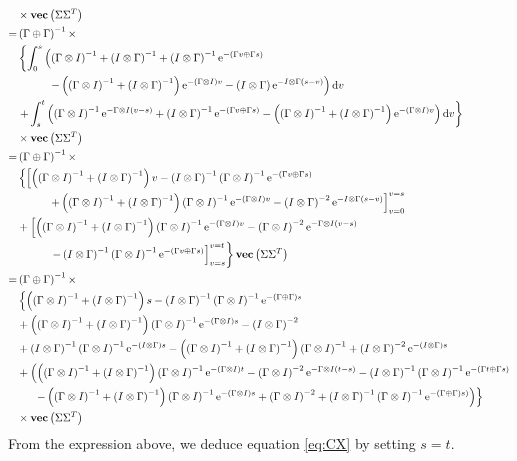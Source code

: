 \begin{align*}
&\times  \Vect{\Sigma\Sigma^T}\nonumber\\
=& \GpG\inv \times\\
&\left\lbrace   \int_0^s \left(  \GoI\inv + \IoG\inv  + \IoG\inv \e^{-(\Gamma v \oplus \Gamma s)} \right. \right.\nonumber\\
&\left.\hspace{1cm} - \left(\GoI\inv + \IoG\inv\right) \e^{-\GoI v} - \IoG\e^{- I \otimes \Gamma (s - v)} \right)\rmd v \\
&\left. + \int_s^t \left(  \GoI\inv \e^{- \Gamma \otimes I (v - s)} + \IoG\inv \e^{-(\Gamma v \oplus \Gamma s)} - \left(\GoI\inv + \IoG\inv\right) \e^{-\GoI v} \right) \rmd v \right\rbrace\nonumber\\
&\times  \Vect{\Sigma\Sigma^T}\nonumber\\
=& \GpG\inv \times\\
&\left\lbrace   \left[  \left(\GoI\inv + \IoG\inv\right)v  - \IoG\inv \GoI\inv \e^{-(\Gamma v \oplus \Gamma s)} \right. \right.\nonumber\\
&\left.\hspace{1cm} + \left(\GoI\inv + \IoG\inv\right)\GoI\inv \e^{-\GoI v} - \IoG^{-2}\e^{- I \otimes \Gamma (s - v)} \right]_{v=0}^{v=s}\nonumber\\
& + \left[\left(\GoI\inv + \IoG\inv\right)\GoI\inv \e^{-\GoI v} - \GoI^{-2}\e^{- \Gamma \otimes I (v - s)}\right.\nonumber \\
&\left. \left.\hspace{1cm}- \IoG\inv\GoI\inv \e^{-(\Gamma v \oplus \Gamma s)} \right]_{v=s}^{v=t}\right\rbrace \Vect{\Sigma\Sigma^T}\nonumber
\\
=& \GpG\inv \times\\
&\left\lbrace   \left(\GoI\inv + \IoG\inv\right)s - \IoG\inv \GoI\inv \e^{-\GpG s}\right.\nonumber\\
& + \left(\GoI\inv + \IoG\inv\right)\GoI\inv \e^{-\GoI s} - \IoG^{-2}  \\
& + \IoG\inv \GoI\inv \e^{-\IoG s} - \left(\GoI\inv + \IoG\inv\right)\GoI\inv + \IoG^{-2}\e^{-\IoG s}\nonumber 
\\
& + \left(\left(\GoI\inv + \IoG\inv\right)\GoI\inv \e^{-\GoI t} - \GoI^{-2}\e^{- \Gamma \otimes I (t - s)} - \IoG\inv\GoI\inv \e^{-(\Gamma t \oplus \Gamma s)}\right.\nonumber \\
&\left. \left.\hspace{0.5cm} - \left(\GoI\inv + \IoG\inv\right)\GoI\inv \e^{-\GoI s} + \GoI^{-2}  +\IoG\inv\GoI\inv \e^{-\GpG s)}  \right)\right\rbrace\nonumber\\
&\times  \Vect{\Sigma\Sigma^T}\nonumber
\end{align*}
From the expression above, we deduce equation \eqref{eq:CX} by setting $s = t$.

